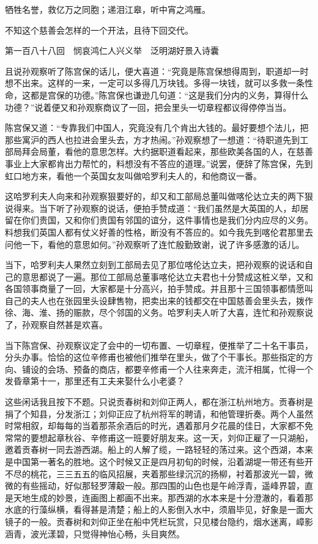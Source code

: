 \documentclass[12pt,UTF8]{ctexbook}
\begin{document}
{{{牺牲名誉，救亿万之同胞；递泪江皋，听中宵之鸿雁。

不知这个慈善会怎样的一个开法，且待下回交代。





第一百八十八回　悯哀鸿仁人兴义举　泛明湖好景入诗囊





且说孙观察听了陈宫保的话儿，便大喜道：“究竟是陈宫保想得周到，职道却一时想不出来。这样的一来，一定可以多得几万块钱。多得一块钱，就可以多救一条性命，这都是宫保的功德。”陈宫保也谦逊几句道：“这是我们分内的义务，算得什么功德？”说着便又和孙观察商议了一回，把会里头一切章程都议得停停当当。

陈宫保又道：“专靠我们中国人，究竟没有几个肯出大钱的。最好要想个法儿，把那些寓沪的西人也拉进会里头去，方才热闹。”孙观察想了一想道：“待职道先到工部局拜会局董，看他的意思怎样。大约据职道看起来，那些欧美各国的人，在慈善事业上大家都肯出力帮忙的，料想没有不答应的道理。”说罢，便辞了陈宫保，先到虹口地方来，看他一个英国女友叫做哈罗利夫人的，和他商议一番。

这哈罗利夫人向来和孙观察狠要好的，却又和工部局总董叫做喀伦达立夫的两下狠说得来。当下听了孙观察的说话，便拍手赞成道：“我们虽然是大英国的人，却居留在你们贵国，又和你们贵国有邻国的谊分，这件事情也是我们分内应尽的义务。料想我们英国人都有仗义好善的性格，断没有不答应的。如今我先到喀伦君那里去问他一下，看他的意思如何。”孙观察听了连忙殷勤致谢，说了许多感激的话儿。

当下，哈罗利夫人果然立刻到工部局去见了那位喀伦达立夫，把孙观察的说话和自己的意思都说了一遍。那位工部局总董事喀伦达立夫君也十分赞成这桩义举，又和各国领事商量了一回，大家都是十分高兴，拍手赞成。并且那十三国领事都情愿叫自己的夫人也在张园里头设肆售物，把卖出来的钱都交在中国慈善会里头去，拨作徐、海、淮、扬的赈款，尽个邻国的义务。哈罗利夫人听了大喜，连忙和孙观察说了，孙观察自然甚是欢喜。

当下陈宫保、孙观察议定了会中的一切布置、一切章程，便推举了二十名干事员，分头办事。恰恰的这位辛修甫也被他们推举在里头，做了个干事长。那些指定的方向、铺设的会场、预备的商店，都要辛修甫一个人往来奔走，流汗相属，忙得一个发昏章第十一，那里还有工夫来娶什么小老婆？

这些闲话我且按下不题。只说贡春树和刘仰正两人，都在浙江杭州地方。贡春树是捐了个知县，分发浙江；刘仰正应了杭州将军的聘请，和他管理折奏。两个人虽然时常相叙，却每每的当着那茶余酒后的时光，遇着那月夕花晨的佳日，大家都不免常常的要想起章秋谷、辛修甫这一班要好朋友来。这一天，刘仰正雇了一只湖船，邀着贡春树一同去游西湖。船上的人解了缆，一路轻轻的荡过来。这个西湖，本来是中国第一著名的胜地。这个时候又正是四月初旬的时候，沿着湖堤一带还有些开不尽的桃花，三三五五的临风招展，夹着那些绿沉沉的扬柳，衬着那波光一碧，微微的有些摇动，好似那轻罗薄觳一般。那四围的山色也是午岭浮青，遥峰界碧，直是天地生成的妙景，连画图上都画不出来。那西湖的水本来是十分澄澈的，看着那水底的行藻纵横，看得甚是清楚；船上的人影倒入水中，须眉毕见，好象是一面大镜子的一般。贡春树和刘仰正坐在船中凭栏玩赏，只见楼台隐约，烟水迷离，嶂影涵青，波光漾碧，只觉得神怡心畅，头目爽然。

}}}
\end{document}
